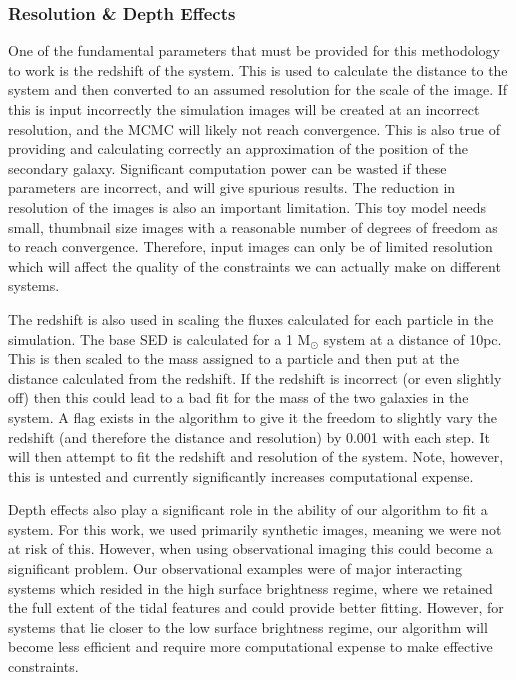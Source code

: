 \subsubsection{Resolution \& Depth Effects}\label{resolution_effect}
\noindent One of the fundamental parameters that must be provided for this methodology to work is the redshift of the system. This is used to calculate the distance to the system and then converted to an assumed resolution for the scale of the image. If this is input incorrectly the simulation images will be created at an incorrect resolution, and the MCMC will likely not reach convergence. This is also true of providing and calculating correctly an approximation of the position of the secondary galaxy. Significant computation power can be wasted if these parameters are incorrect, and will give spurious results. The reduction in resolution of the images is also an important limitation. This toy model needs small, thumbnail size images with a reasonable number of degrees of freedom as to reach convergence. Therefore, input images can only be of limited resolution which will affect the quality of the constraints we can actually make on different systems. 

The redshift is also used in scaling the fluxes calculated for each particle in the simulation. The base SED is calculated for a 1 M$_\odot$ system at a distance of 10pc. This is then scaled to the mass assigned to a particle and then put at the distance calculated from the redshift. If the redshift is incorrect (or even slightly off) then this could lead to a bad fit for the mass of the two galaxies in the system. A flag exists in the algorithm to give it the freedom to slightly vary the redshift (and therefore the distance and resolution) by 0.001 with each step. It will then attempt to fit the redshift and resolution of the system. Note, however, this is untested and currently significantly increases computational expense.

Depth effects also play a significant role in the ability of our algorithm to fit a system. For this work, we used primarily synthetic images, meaning we were not at risk of this. However, when using observational imaging this could become a significant problem. Our observational examples were of major interacting systems which resided in the high surface brightness regime, where we retained the full extent of the tidal features and could provide better fitting. However, for systems that lie closer to the low surface brightness regime, our algorithm will become less efficient and require more computational expense to make effective constraints.


